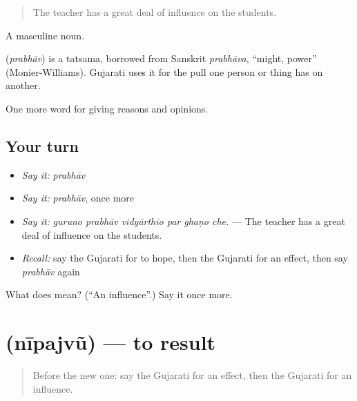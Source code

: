 \begin{quote}
The teacher has a great deal of influence on the students.
\end{quote}

A masculine noun.

\begin{cousinweb}
\textbf{} (\emph{prabhāv}) is a tatsama, borrowed from Sanskrit \emph{prabhāva}, \textquotedblleft{}might, power\textquotedblright{} (Monier-Williams). Gujarati uses it for the pull one person or thing has on another.
\end{cousinweb}

\begin{grammarlens}[title={What you've built}]
One more word for giving reasons and opinions.
\end{grammarlens}

\subsection*{Your turn}
\begin{itemize}
\raggedright
  \item \emph{Say it:} \emph{prabhāv}
  \item \emph{Say it:} \emph{prabhāv}, once more
  \item \emph{Say it:} \emph{guruno prabhāv vidyārthīo par ghaṇo che.} — The teacher has a great deal of influence on the students.
  \item \emph{Recall:} say the Gujarati for to hope, then the Gujarati for an effect, then say \emph{prabhāv} again
\end{itemize}

\begin{tcolorbox}[breakable,colback=teal!4,colframe=teal!35!black,title={Before you move on}]
What does  mean? (\textquotedblleft{}An influence\textquotedblright{}.) Say it once more.
\end{tcolorbox}
\section[\texorpdfstring{\gu{નીપજવું} (nīpajvũ)}{નીપજવું (nīpajvũ)}]{ (nīpajvũ) — to result}

\label{lesson:GU-C339-nipajvu}



\begin{quote}
Before the new one: say the Gujarati for an effect, then the Gujarati for an influence.
\end{quote}

